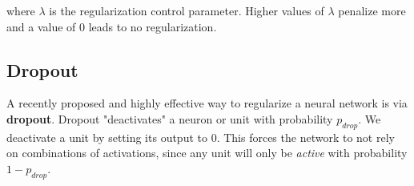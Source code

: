 where $\lambda$ is the regularization control parameter. Higher values of $\lambda$ penalize more and a value of 0 leads to no regularization.

\subsection{Dropout}
A recently proposed and highly effective way to regularize a neural network is via \textbf{dropout}\cite{hinton2012improving}\cite{srivastava2014dropout}.
Dropout "deactivates" a neuron or unit with probability $p_{drop}$. We deactivate a unit
by setting its output to 0. This forces the network to not rely on combinations of
activations, since any unit will only be \textit{active} with probability $1-p_{drop}$.
